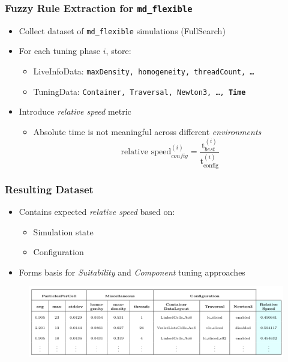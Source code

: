 \documentclass[
	10pt,
	t		%
]{beamer}
\begin{document}
\begin{frame}
	\frametitle{Fuzzy Rule Extraction for \texttt{md\_flexible}}
	
	\begin{itemize}
		\item Collect dataset of \texttt{md\_flexible} simulations (FullSearch)
		\item For each tuning phase $i$, store:
		      \begin{itemize}
			      \item LiveInfoData: {\footnotesize \texttt{maxDensity, homogeneity, threadCount, \dots} }
			      \item TuningData: {\footnotesize \texttt{Container, Traversal, Newton3, \dots, \textbf{Time}} }
		      \end{itemize}
		\item Introduce \textit{relative speed} metric
		      \begin{itemize}
			      \item Absolute time is not meaningful across different \textit{environments}
			            \[ \text{relative speed}_{config}^{(i)} = \frac{\text{t}_{best}^{(i)}}{\text{t}_{\text{config}}^{(i)}} \]
		      \end{itemize}
	\end{itemize}
	
\end{frame}

\begin{frame}
	\frametitle{Resulting Dataset}
	
	\begin{itemize}
		\item Contains expected \textit{relative speed} based on:
		      \begin{itemize}
			      \item Simulation state
			      \item Configuration
		      \end{itemize}
		\item Forms basis for \textit{Suitability} and \textit{Component} tuning approaches
	\end{itemize}
	
	\begin{figure}
		\centering
		\includegraphics[width=1\textwidth]{figures/relative-speed-table.png}
	\end{figure}
	
\end{frame}
\end{document}
